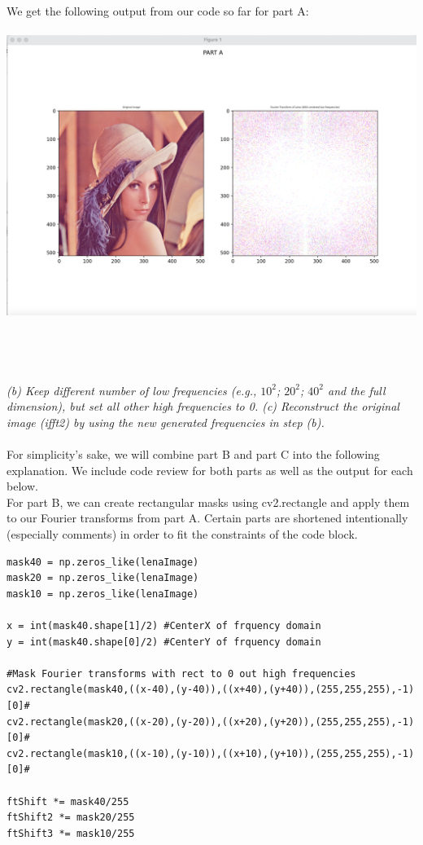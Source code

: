 \documentclass[12pt]{article}
\begin{document}
\noindent We get the following output from our code so far for part A:\\\\
\includegraphics[scale=0.4]{2A.png}\\\\
\pagebreak\\\\\\
\noindent \emph { (b) Keep different number of low frequencies (e.g., $10^2$; $20^2$; $40^2$ and the full dimension), but set all other high frequencies to 0.
(c) Reconstruct the original image (ifft2) by using the new generated frequencies in step
(b).}\\\\
\;
\;
\noindent For simplicity's sake, we will combine part B and part C into the following explanation. We include code review for both parts as well as the output for each below.\\

\noindent For part B, we can create rectangular masks using cv2.rectangle and apply them to our Fourier transforms from part A. Certain parts are shortened intentionally (especially comments) in order to fit the constraints of the code block. \\

\begin{mdframed}[backgroundcolor=bg]
\begin{verbatim}
mask40 = np.zeros_like(lenaImage)
mask20 = np.zeros_like(lenaImage)
mask10 = np.zeros_like(lenaImage)

x = int(mask40.shape[1]/2) #CenterX of frquency domain
y = int(mask40.shape[0]/2) #CenterY of frquency domain

#Mask Fourier transforms with rect to 0 out high frequencies 
cv2.rectangle(mask40,((x-40),(y-40)),((x+40),(y+40)),(255,255,255),-1)[0]#
cv2.rectangle(mask20,((x-20),(y-20)),((x+20),(y+20)),(255,255,255),-1)[0]#
cv2.rectangle(mask10,((x-10),(y-10)),((x+10),(y+10)),(255,255,255),-1)[0]#

ftShift *= mask40/255
ftShift2 *= mask20/255
ftShift3 *= mask10/255
\end{verbatim}
\end{mdframed}\\\\
\;
\end{document}

